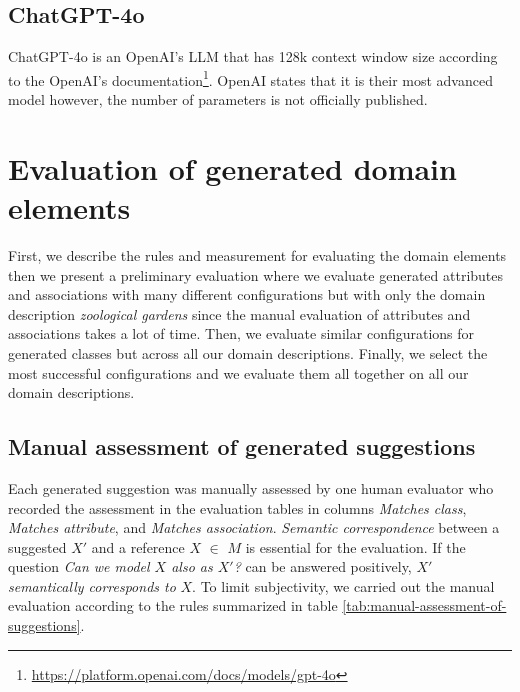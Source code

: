 \subsection{ChatGPT-4o}

ChatGPT-4o is an OpenAI's LLM that has 128k context window size according to the OpenAI's documentation\footnote{\url{https://platform.openai.com/docs/models/gpt-4o}}. OpenAI states that it is their most advanced model however, the number of parameters is not officially published.


\section{Evaluation of generated domain elements}

First, we describe the rules and measurement for evaluating the domain elements then we present a preliminary evaluation where we evaluate generated attributes and associations with many different configurations but with only the domain description \textit{zoological gardens} since the manual evaluation of attributes and associations takes a lot of time. Then, we evaluate similar configurations for generated classes but across all our domain descriptions. Finally, we select the most successful configurations and we evaluate them all together on all our domain descriptions.


\subsection{Manual assessment of generated suggestions}

Each generated suggestion was manually assessed by one human evaluator who recorded the assessment in the evaluation tables in columns \emph{Matches class}, \emph{Matches attribute}, and \emph{Matches association}.
\emph{Semantic correspondence} between a suggested $X'$ and a reference $X$ $\in$ $M$ is essential for the evaluation.
If the question \emph{Can we model $X$ also as $X'$?} can be answered positively, $X'$ \emph{semantically corresponds to} $X$. To limit subjectivity, we carried out the manual evaluation according to the rules summarized in table \ref{tab:manual-assessment-of-suggestions}.

